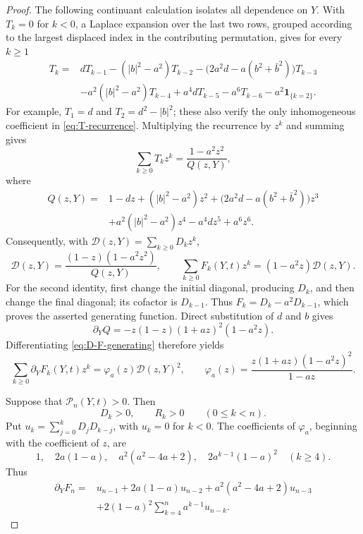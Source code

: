 \documentclass[12pt,anonymous]{iopjournal}
\numberwithin{equation}{section}
\theoremstyle{remark}
\begin{document}
\begin{proof}
The following continuant calculation isolates all dependence on \(Y\).
With \(T_k=0\) for \(k<0\), a Laplace expansion over the last two rows,
grouped according to the largest displaced index in the contributing
permutation, gives for every \(k\geq1\)
\begin{equation}\label{eq:T-recurrence}
\begin{aligned}
T_k={}&dT_{k-1}-(|b|^2-a^2)T_{k-2}
-\bigl(2a^2d-a(b^2+\bar b^2)\bigr)T_{k-3}\\
&-a^2(|b|^2-a^2)T_{k-4}+a^4dT_{k-5}-a^6T_{k-6}
-a^2\boldsymbol 1_{\{k=2\}}.
\end{aligned}
\end{equation}
For example, \(T_1=d\) and \(T_2=d^2-|b|^2\); these also verify the
only inhomogeneous coefficient in \eqref{eq:T-recurrence}.  Multiplying
the recurrence by \(z^k\) and summing gives
\begin{equation}\label{eq:T-generating}
 \sum_{k\geq0}T_kz^k=\frac{1-a^2z^2}{Q(z,Y)},
\end{equation}
where
\[
\begin{aligned}
 Q(z,Y)={}&1-dz+(|b|^2-a^2)z^2
 +\bigl(2a^2d-a(b^2+\bar b^2)\bigr)z^3\\
 &+a^2(|b|^2-a^2)z^4-a^4dz^5+a^6z^6.
\end{aligned}
\]
Consequently, with \(\mathcal D(z,Y)=\sum_{k\geq0}D_kz^k\),
\begin{equation}\label{eq:D-F-generating}
 \mathcal D(z,Y)=\frac{(1-z)(1-a^2z^2)}{Q(z,Y)},\qquad
 \sum_{k\geq0}F_k(Y,t)z^k=(1-a^2z)\mathcal D(z,Y).
\end{equation}
For the second identity, first change the initial diagonal, producing
\(D_k\), and then change the final diagonal; its cofactor is
\(D_{k-1}\).  Thus \(F_k=D_k-a^2D_{k-1}\), which proves the asserted
generating function.  Direct substitution of \(d\) and \(b\) gives
\[
 \partial_YQ=-z(1-z)(1+az)^2(1-a^2z).
\]
Differentiating \eqref{eq:D-F-generating} therefore yields
\begin{equation}\label{eq:F-prime-generating}
 \sum_{k\geq0}\partial_YF_k(Y,t)z^k
 =\varphi_a(z)\mathcal D(z,Y)^2,
 \qquad
 \varphi_a(z)=\frac{z(1+az)(1-a^2z)^2}{1-az}.
\end{equation}

Suppose that \(\mathcal P_n(Y,t)>0\).  Then
\begin{equation}\label{eq:D-R-positive}
 D_k>0,\qquad R_k>0\qquad(0\leq k<n).
\end{equation}
Put \(u_k=\sum_{j=0}^kD_jD_{k-j}\), with \(u_k=0\) for \(k<0\).
The coefficients of \(\varphi_a\), beginning with the coefficient of
\(z\), are
\[
 1,\quad 2a(1-a),\quad a^2(a^2-4a+2),\quad
 2a^{k-1}(1-a)^2\quad(k\geq4).
\]
Thus
\begin{equation}\label{eq:F-prime-convolution}
\begin{aligned}
 \partial_YF_n={}&u_{n-1}+2a(1-a)u_{n-2}
 +a^2(a^2-4a+2)u_{n-3}\\
 &+2(1-a)^2\sum_{k=4}^na^{k-1}u_{n-k}.
\end{aligned}
\end{equation}


\end{proof}
\end{document}
